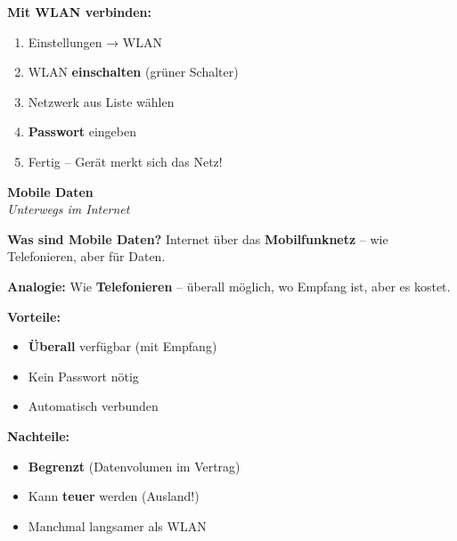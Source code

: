 \documentclass[a4paper,landscape,8pt]{extarticle}
\begin{document}
\begin{minipage}[t]{0.32\linewidth}
\vspace{2mm}

\textbf{Mit WLAN verbinden:}
\begin{enumerate}
\item Einstellungen → WLAN
\item WLAN \textbf{einschalten} (grüner Schalter)
\item Netzwerk aus Liste wählen
\item \textbf{Passwort} eingeben
\item Fertig -- Gerät merkt sich das Netz!
\end{enumerate}

\end{minipage}%
\hfill%
\begin{minipage}[t]{0.32\linewidth}
\begin{center}
\colorbox{mobilegreen!10}{%
\begin{minipage}{0.95\linewidth}
\vspace{2mm}
\begin{center}
{\Large\bfseries\textcolor{mobilegreen}{Mobile Daten}}\\[1pt]
{\footnotesize\itshape Unterwegs im Internet}
\end{center}
\vspace{2mm}
\end{minipage}%
}
\end{center}

\vspace{1mm}

\textbf{Was sind Mobile Daten?} Internet über das \textbf{Mobilfunknetz} -- wie Telefonieren, aber für Daten.

\textbf{Analogie:} Wie \textbf{Telefonieren} -- überall möglich, wo Empfang ist, aber es kostet.

\textbf{Vorteile:}
\begin{itemize}
\item \textbf{Überall} verfügbar (mit Empfang)
\item Kein Passwort nötig
\item Automatisch verbunden
\end{itemize}

\textbf{Nachteile:}
\begin{itemize}
\item \textbf{Begrenzt} (Datenvolumen im Vertrag)
\item Kann \textbf{teuer} werden (Ausland!)
\item Manchmal langsamer als WLAN
\end{itemize}


\end{minipage}
\end{document}
